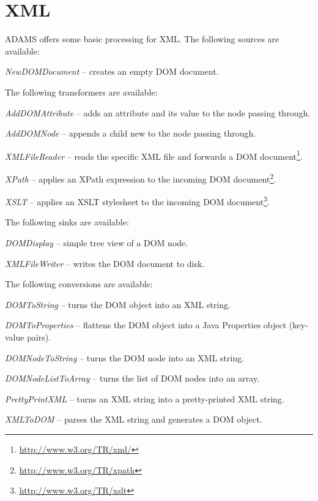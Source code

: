 \section{XML}
\label{xml}
ADAMS offers some basic processing for XML.
The following sources are available:
\begin{tight_itemize}
	\item \textit{NewDOMDocument} -- creates an empty DOM document.
\end{tight_itemize}
The following transformers are available:
\begin{tight_itemize}
	\item \textit{AddDOMAttribute} -- adds an attribute and its value to the 
	node passing through.
	\item \textit{AddDOMNode} -- appends a child new to the node passing through.
	\item \textit{XMLFileReader} -- reads the specific XML file and forwards
	a DOM document\footnote{\url{http://www.w3.org/TR/xml/}{}}.
	\item \textit{XPath} -- applies an XPath expression to the incoming DOM
	document\footnote{\url{http://www.w3.org/TR/xpath}{}}.
	\item \textit{XSLT} -- applies an XSLT stylesheet to the incoming DOM
	document\footnote{\url{http://www.w3.org/TR/xslt}{}}.
\end{tight_itemize}
The following sinks are available:
\begin{tight_itemize}
	\item \textit{DOMDisplay} -- simple tree view of a DOM node.
	\item \textit{XMLFileWriter} -- writes the DOM document to disk.
\end{tight_itemize}
The following conversions are available:
\begin{tight_itemize}
	\item \textit{DOMToString} -- turns the DOM object into an XML string.
	\item \textit{DOMToProperties} -- flattens the DOM object into a Java 
	Properties object (key-value pairs).
	\item \textit{DOMNodeToString} -- turns the DOM node into an XML string.
	\item \textit{DOMNodeListToArray} -- turns the list of DOM nodes into an array.
	\item \textit{PrettyPrintXML} -- turns an XML string into a pretty-printed XML string.
	\item \textit{XMLToDOM} -- parses the XML string and generates a DOM
	object.
\end{tight_itemize}


